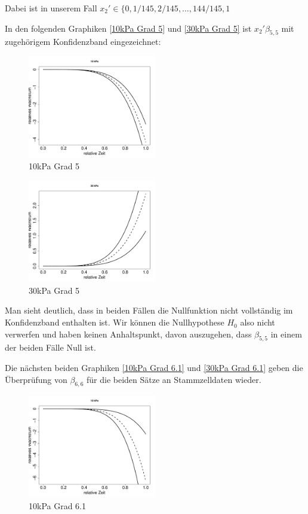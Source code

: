 \documentclass[12pt,a4paper]{article}
\theoremstyle{definition}
\theoremstyle{definition}
\theoremstyle{definition}
\theoremstyle{definition}
\begin{document}
Dabei ist in unserem Fall $x_2' \in \{0, 1/145, 2/145, \ldots, 144/145, 1$ 

In den folgenden Graphiken \eqref{10kPa Grad 5} und \eqref{30kPa Grad 5} ist $x_2' \beta_{5,5}$ mit zugehörigem Konfidenzband eingezeichnet:

\begin{figure}[H] 
  \centering
     \includegraphics[width=0.5\textwidth]{10kPa-Grad-5-KB}
  \caption{10kPa Grad 5}
  \label{10kPa Grad 5}
\end{figure}

\begin{figure}[H] 
  \centering
     \includegraphics[width=0.5\textwidth]{30kPa-Grad-5-KB}
  \caption{30kPa Grad 5}
  \label{30kPa Grad 5}
\end{figure}

Man sieht deutlich, dass in beiden Fällen die Nullfunktion nicht vollständig im Konfidenzband enthalten ist. Wir können die Nullhypothese $H_0$ also nicht verwerfen und haben keinen Anhaltspunkt, davon auszugehen, dass $\beta_{5,5}$ in einem der beiden Fälle Null ist.

Die nächsten beiden Graphiken \eqref{10kPa Grad 6.1} und \eqref{30kPa Grad 6.1} geben  die Überprüfung von $\beta_{6,6}$ für die beiden Sätze an Stammzelldaten wieder.

\begin{figure}[H] 
  \centering
     \includegraphics[width=0.5\textwidth]{10kPa-Grad-6-1-KB}
  \caption{10kPa Grad 6.1}
  \label{10kPa Grad 6.1}
\end{figure}
\end{document}
